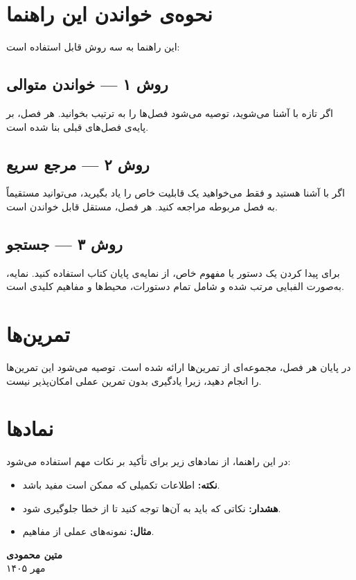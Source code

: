 \section*{نحوه‌ی خواندن این راهنما}

این راهنما به سه روش قابل استفاده است:

\subsection*{روش ۱ — خواندن متوالی}

اگر تازه با  آشنا می‌شوید، توصیه
می‌شود فصل‌ها را به ترتیب بخوانید. هر فصل، بر
پایه‌ی فصل‌های قبلی بنا شده است.

\subsection*{روش ۲ — مرجع سریع}

اگر با  آشنا هستید و فقط می‌خواهید
یک قابلیت خاص را یاد بگیرید، می‌توانید مستقیماً
به فصل مربوطه مراجعه کنید. هر فصل، مستقل قابل
خواندن است.

\subsection*{روش ۳ — جستجو}

برای پیدا کردن یک دستور یا مفهوم خاص، از نمایه‌ی
پایان کتاب استفاده کنید. نمایه، به‌صورت الفبایی
مرتب شده و شامل تمام دستورات، محیط‌ها و مفاهیم
کلیدی است.

\section*{تمرین‌ها}

در پایان هر فصل، مجموعه‌ای از تمرین‌ها ارائه
شده است. توصیه می‌شود این تمرین‌ها را انجام
دهید، زیرا یادگیری  بدون تمرین
عملی امکان‌پذیر نیست.

\section*{نمادها}

در این راهنما، از نمادهای زیر برای تأکید بر
نکات مهم استفاده می‌شود:

\begin{itemize}
    \item \textbf{نکته:} اطلاعات تکمیلی که
    ممکن است مفید باشد.
    \item \textbf{هشدار:} نکاتی که باید به
    آن‌ها توجه کنید تا از خطا جلوگیری شود.
    \item \textbf{مثال:} نمونه‌های عملی از
    مفاهیم.
\end{itemize}

\vspace{1cm}

\begin{flushleft}
    \textbf{متین محمودی} \\
    مهر ۱۴۰۵
\end{flushleft}

\clearpage